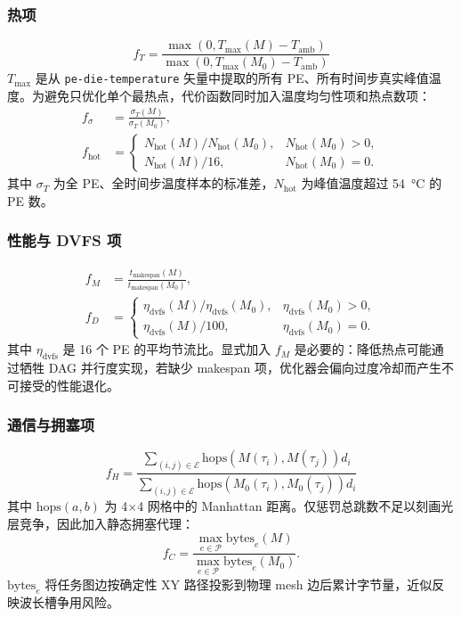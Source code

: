 \documentclass[conference]{IEEEtran}
\begin{document}
\subsubsection{热项}
\begin{equation}
f_T = \frac{\max(0, T_{\max}(M)-T_{\text{amb}})}
{\max(0, T_{\max}(M_0)-T_{\text{amb}})}
\end{equation}
$T_{\max}$ 是从 \texttt{pe-die-temperature} 矢量中提取的所有 PE、所有时间步真实峰值温度。为避免只优化单个最热点，代价函数同时加入温度均匀性项和热点数项：
\begin{align}
f_\sigma &= \frac{\sigma_T(M)}{\sigma_T(M_0)},\\
f_{\text{hot}} &=
\begin{cases}
N_{\text{hot}}(M)/N_{\text{hot}}(M_0), & N_{\text{hot}}(M_0)>0,\\
N_{\text{hot}}(M)/16, & N_{\text{hot}}(M_0)=0.
\end{cases}
\end{align}
其中 $\sigma_T$ 为全 PE、全时间步温度样本的标准差，$N_{\text{hot}}$ 为峰值温度超过 \SI{54}{\degreeCelsius} 的 PE 数。

\subsubsection{性能与 DVFS 项}
\begin{align}
f_M &= \frac{t_{\text{makespan}}(M)}{t_{\text{makespan}}(M_0)},\\
f_D &=
\begin{cases}
\eta_{\text{dvfs}}(M)/\eta_{\text{dvfs}}(M_0), & \eta_{\text{dvfs}}(M_0)>0,\\
\eta_{\text{dvfs}}(M)/100, & \eta_{\text{dvfs}}(M_0)=0.
\end{cases}
\end{align}
其中 $\eta_{\text{dvfs}}$ 是 16 个 PE 的平均节流比。显式加入 $f_M$ 是必要的：降低热点可能通过牺牲 DAG 并行度实现，若缺少 makespan 项，优化器会偏向过度冷却而产生不可接受的性能退化。

\subsubsection{通信与拥塞项}
\begin{equation}
f_H = \frac{\sum_{(i,j)\in\mathcal{E}} \text{hops}(M(\tau_i),M(\tau_j)) d_i}
{\sum_{(i,j)\in\mathcal{E}} \text{hops}(M_0(\tau_i),M_0(\tau_j)) d_i}
\end{equation}
其中 $\text{hops}(a,b)$ 为 4$\times$4 网格中的 Manhattan 距离。仅惩罚总跳数不足以刻画光层竞争，因此加入静态拥塞代理：
\begin{equation}
f_C = \frac{\max_{e\in\mathcal{P}} \text{bytes}_e(M)}
{\max_{e\in\mathcal{P}} \text{bytes}_e(M_0)} .
\end{equation}
$\text{bytes}_e$ 将任务图边按确定性 XY 路径投影到物理 mesh 边后累计字节量，近似反映波长槽争用风险。
\end{document}
